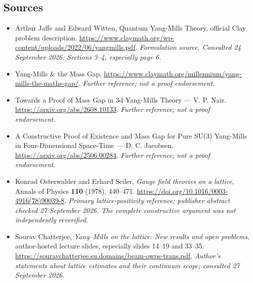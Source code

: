 \documentclass[11pt]{article}
\begin{document}
\subsection{Sources}
\begin{itemize}
\item[S1]Arthur Jaffe and Edward Witten, Quantum Yang-Mills Theory, official Clay problem description.
\url{https://www.claymath.org/wp-content/uploads/2022/06/yangmills.pdf}.
\textit{Formulation source. Consulted 24 September 2026: Sections 3--4, especially page 6.}
\item[S2]Yang-Mills \& the Mass Gap.
\url{https://www.claymath.org/millennium/yang-mills-the-maths-gap/}.
\textit{Further reference; not a proof endorsement.}
\item[S3]Towards a Proof of Mass Gap in 3d Yang-Mills Theory — V. P. Nair.
\url{https://arxiv.org/abs/2608.10133}.
\textit{Further reference; not a proof endorsement.}
\item[S4]A Constructive Proof of Existence and Mass Gap for Pure SU(3) Yang-Mills in Four-Dimensional Space-Time — D. C. Jacobsen.
\url{https://arxiv.org/abs/2506.00284}.
\textit{Further reference; not a proof endorsement.}
\item[E1]Konrad Osterwalder and Erhard Seiler, \emph{Gauge field theories on a lattice}, Annals of Physics \textbf{110} (1978), 440--471.
\url{https://doi.org/10.1016/0003-4916(78)90039-8}.
\textit{Primary lattice-positivity reference; publisher abstract checked 27 September 2026. The complete constructive argument was not independently reverified.}
\item[E2]Sourav Chatterjee, \emph{Yang--Mills on the lattice: New results and open problems}, author-hosted lecture slides, especially slides 14--19 and 33--35.
\url{https://souravchatterjee.su.domains/beam-owps-trans.pdf}.
\textit{Author's statements about lattice estimates and their continuum scope; consulted 27 September 2026.}
\end{itemize}
\end{document}
